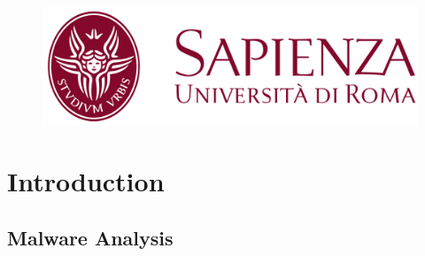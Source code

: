 \documentclass[compress]{beamer}
\begin{document}
\newcommand{\stt}{\small\tt}
\newcommand{\word}[1]{\fontsize{10.4}{10}\textsf{#1}}        %
\newcommand{\wordb}[2]{\fontsize{10.4}{10}\textsf{#1}$_#2$}        %
\newcommand{\wordc}[3]{\fontsize{10.4}{10}\textsf{#1}$_#2^#3$}        %
\newcommand{\wikipage}[1]{\textsc{#1}}        %

\newcommand\tab[1][0.5cm]{\hspace*{#1}}

\begin{frame}
 
 \begin{figure}
     \centering
    \vspace{0.5cm}
     \includegraphics[scale=.40]{image/sapienza.png}\\
    
 \end{figure}
 
\titlepage
\end{frame}


\section{Introduction}

\subsection{Malware Analysis}
\end{document}
